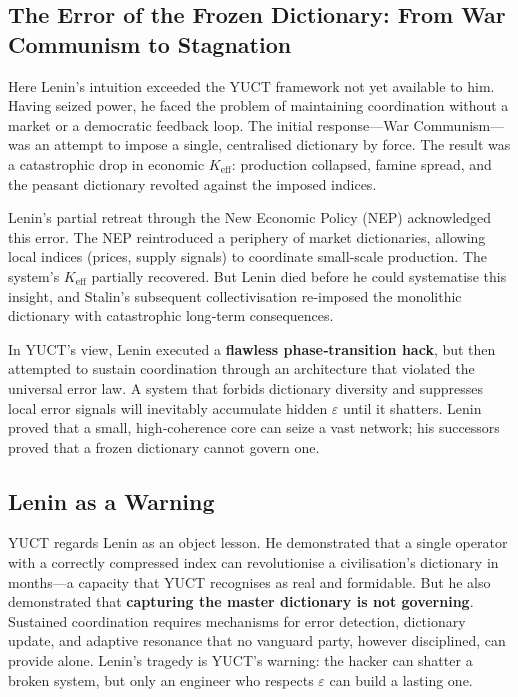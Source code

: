 \documentclass[12pt,a4paper]{article}
\newcommand{\Keff}{K_{\mathrm{eff}}}
\begin{document}
	\subsection{The Error of the Frozen Dictionary: From War Communism to Stagnation}
	
	Here Lenin’s intuition exceeded the YUCT framework not yet available to him. Having seized power, he faced the problem of maintaining coordination without a market or a democratic feedback loop. The initial response—War Communism—was an attempt to impose a single, centralised dictionary by force. The result was a catastrophic drop in economic \(\Keff\): production collapsed, famine spread, and the peasant dictionary revolted against the imposed indices.
	
	Lenin’s partial retreat through the New Economic Policy (NEP) acknowledged this error. The NEP reintroduced a periphery of market dictionaries, allowing local indices (prices, supply signals) to coordinate small‑scale production. The system’s \(\Keff\) partially recovered. But Lenin died before he could systematise this insight, and Stalin’s subsequent collectivisation re‑imposed the monolithic dictionary with catastrophic long‑term consequences.
	
	In YUCT’s view, Lenin executed a \textbf{flawless phase‑transition hack}, but then attempted to sustain coordination through an architecture that violated the universal error law. A system that forbids dictionary diversity and suppresses local error signals will inevitably accumulate hidden \(\varepsilon\) until it shatters. Lenin proved that a small, high‑coherence core can seize a vast network; his successors proved that a frozen dictionary cannot govern one.
	
	\subsection{Lenin as a Warning}
	
	YUCT regards Lenin as an object lesson. He demonstrated that a single operator with a correctly compressed index can revolutionise a civilisation’s dictionary in months—a capacity that YUCT recognises as real and formidable. But he also demonstrated that \textbf{capturing the master dictionary is not governing}. Sustained coordination requires mechanisms for error detection, dictionary update, and adaptive resonance that no vanguard party, however disciplined, can provide alone. Lenin’s tragedy is YUCT’s warning: the hacker can shatter a broken system, but only an engineer who respects \(\varepsilon\) can build a lasting one.
	
\end{document}
